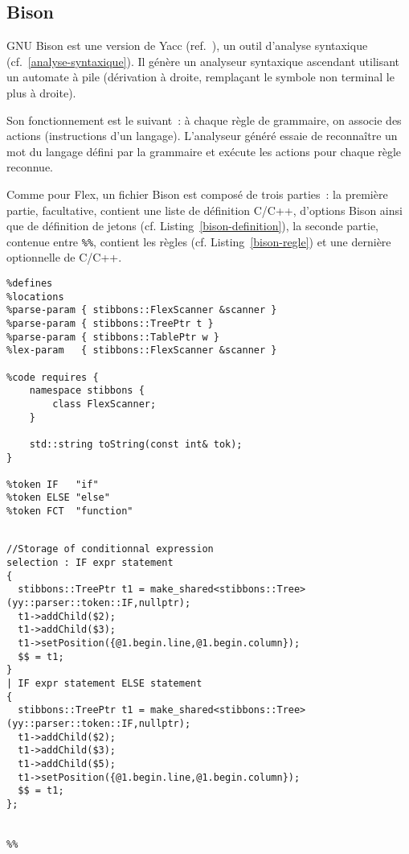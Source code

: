 \subsection{Bison}
\label{Bison}

GNU Bison est une version de Yacc (ref.~\cite{bison}), un outil d'analyse syntaxique (cf.~\ref{analyse-syntaxique}). Il génère un analyseur syntaxique ascendant utilisant un automate à pile (dérivation à droite, remplaçant le symbole non terminal le plus à droite).

Son fonctionnement est le suivant~: à chaque règle de grammaire, on associe des actions (instructions d'un langage). L'analyseur généré essaie de reconnaître un mot du langage défini par la grammaire et exécute les actions pour chaque règle reconnue.

Comme pour Flex, un fichier Bison est composé de trois parties~: la première partie, facultative, contient une liste de définition C/C++, d'options Bison ainsi que de définition de jetons (cf. Listing~\ref{bison-definition}), la seconde partie, contenue entre \verb|%%|, contient les règles (cf. Listing~\ref{bison-regle}) et une dernière optionnelle de C/C++.

\begin{lstlisting}[label=bison-definition,caption=Definition C++ en bison]
%skeleton "lalr1.cc"
%defines
%locations
%parse-param { stibbons::FlexScanner &scanner }
%parse-param { stibbons::TreePtr t }
%parse-param { stibbons::TablePtr w }
%lex-param   { stibbons::FlexScanner &scanner }

%code requires {
	namespace stibbons {
		class FlexScanner;
	}

	std::string toString(const int& tok);
}

%token IF   "if"
%token ELSE "else"
%token FCT  "function"
\end{lstlisting}

\begin{lstlisting}[label=bison-regle,caption=Règles de grammaire en bison]
%%

//Storage of conditionnal expression
selection : IF expr statement
{
  stibbons::TreePtr t1 = make_shared<stibbons::Tree>(yy::parser::token::IF,nullptr);
  t1->addChild($2);
  t1->addChild($3);
  t1->setPosition({@1.begin.line,@1.begin.column});
  $$ = t1;
}
| IF expr statement ELSE statement
{
  stibbons::TreePtr t1 = make_shared<stibbons::Tree>(yy::parser::token::IF,nullptr);
  t1->addChild($2);
  t1->addChild($3);
  t1->addChild($5);
  t1->setPosition({@1.begin.line,@1.begin.column});
  $$ = t1;
};


%%
\end{lstlisting}

